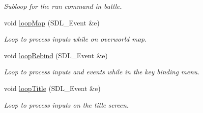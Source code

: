 \begin{DoxyCompactItemize}
\begin{DoxyCompactList}\small\item\em Subloop for the \textquotesingle{}run\textquotesingle{} command in battle. \end{DoxyCompactList}\item 
void \hyperlink{class_game_state_a87291e60906c205c34fa84ea957fa898}{loop\+Map} (S\+D\+L\+\_\+\+Event \&e)\hypertarget{class_game_state_a87291e60906c205c34fa84ea957fa898}{}\label{class_game_state_a87291e60906c205c34fa84ea957fa898}

\begin{DoxyCompactList}\small\item\em Loop to process inputs while on overworld map. \end{DoxyCompactList}\item 
void \hyperlink{class_game_state_abd3d3df0598dd6731117cab805fa0eef}{loop\+Rebind} (S\+D\+L\+\_\+\+Event \&e)\hypertarget{class_game_state_abd3d3df0598dd6731117cab805fa0eef}{}\label{class_game_state_abd3d3df0598dd6731117cab805fa0eef}

\begin{DoxyCompactList}\small\item\em Loop to process inputs and events while in the key binding menu. \end{DoxyCompactList}\item 
void \hyperlink{class_game_state_a1fff6670e9d9ce3806d7261cfd829237}{loop\+Title} (S\+D\+L\+\_\+\+Event \&e)\hypertarget{class_game_state_a1fff6670e9d9ce3806d7261cfd829237}{}\label{class_game_state_a1fff6670e9d9ce3806d7261cfd829237}

\begin{DoxyCompactList}\small\item\em Loop to process inputs on the title screen. \end{DoxyCompactList}\end{DoxyCompactItemize}
